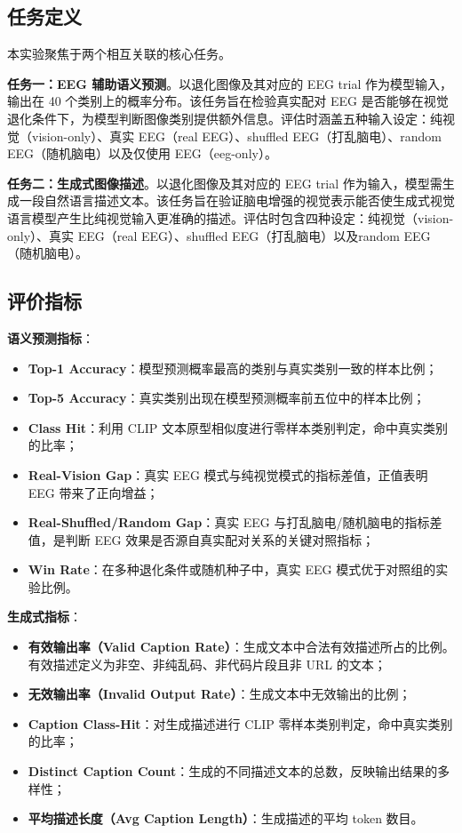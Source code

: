 \subsection{任务定义}

本实验聚焦于两个相互关联的核心任务。

\textbf{任务一：EEG 辅助语义预测}。以退化图像及其对应的 EEG trial 作为模型输入，输出在 40 个类别上的概率分布。该任务旨在检验真实配对 EEG 是否能够在视觉退化条件下，为模型判断图像类别提供额外信息。评估时涵盖五种输入设定：纯视觉（vision-only）、真实 EEG（real EEG）、shuffled EEG（打乱脑电）、random EEG（随机脑电）以及仅使用 EEG（eeg-only）。

\textbf{任务二：生成式图像描述}。以退化图像及其对应的 EEG trial 作为输入，模型需生成一段自然语言描述文本。该任务旨在验证脑电增强的视觉表示能否使生成式视觉语言模型产生比纯视觉输入更准确的描述。评估时包含四种设定：纯视觉（vision-only）、真实 EEG（real EEG）、shuffled EEG（打乱脑电）以及random EEG（随机脑电）。

\subsection{评价指标}

\textbf{语义预测指标}：

\begin{itemize}
  \item \textbf{Top-1 Accuracy}：模型预测概率最高的类别与真实类别一致的样本比例；
  \item \textbf{Top-5 Accuracy}：真实类别出现在模型预测概率前五位中的样本比例；
  \item \textbf{Class Hit}：利用 CLIP 文本原型相似度进行零样本类别判定，命中真实类别的比率；
  \item \textbf{Real-Vision Gap}：真实 EEG 模式与纯视觉模式的指标差值，正值表明 EEG 带来了正向增益；
  \item \textbf{Real-Shuffled/Random Gap}：真实 EEG 与打乱脑电/随机脑电的指标差值，是判断 EEG 效果是否源自真实配对关系的关键对照指标；
  \item \textbf{Win Rate}：在多种退化条件或随机种子中，真实 EEG 模式优于对照组的实验比例。
\end{itemize}

\textbf{生成式指标}：

\begin{itemize}
  \item \textbf{有效输出率（Valid Caption Rate）}：生成文本中合法有效描述所占的比例。有效描述定义为非空、非纯乱码、非代码片段且非 URL 的文本；
  \item \textbf{无效输出率（Invalid Output Rate）}：生成文本中无效输出的比例；
  \item \textbf{Caption Class-Hit}：对生成描述进行 CLIP 零样本类别判定，命中真实类别的比率；
  \item \textbf{Distinct Caption Count}：生成的不同描述文本的总数，反映输出结果的多样性；
  \item \textbf{平均描述长度（Avg Caption Length）}：生成描述的平均 token 数目。
\end{itemize}
